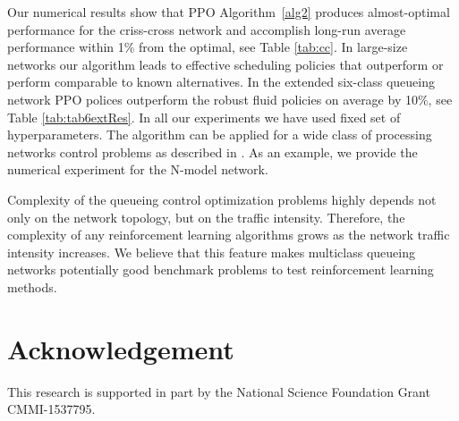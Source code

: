 \documentclass[11pt]{article}
\theoremstyle{definition}
\numberwithin{equation}{section}
\begin{document}
Our numerical results show that   PPO Algorithm~\ref{alg2} produces  almost-optimal performance for the criss-cross network and accomplish  long-run average performance within 1\% from the optimal, see Table \ref{tab:cc}. In large-size networks our algorithm leads to effective scheduling policies that outperform or perform comparable to known alternatives. In the extended six-class queueing network PPO polices  outperform  the robust fluid policies on average by  10\%, see Table \ref{tab:tab6extRes}.  In all our experiments we have used fixed set of hyperparameters. The algorithm can be applied for a wide class of  processing networks control problems  as described in \cite{DaiHarr2020}.  As an example, we provide the numerical experiment for the N-model network.


Complexity of the queueing control optimization problems highly depends
not only on the network topology, but on the traffic
intensity. Therefore, the complexity of  any reinforcement
  learning algorithms grows as the network traffic intensity
  increases. We believe that this feature makes multiclass queueing
networks potentially good benchmark problems to test reinforcement
learning methods.



\section*{Acknowledgement}

This research is supported in part by the National Science Foundation Grant CMMI-1537795.




\appendix
\end{document}
